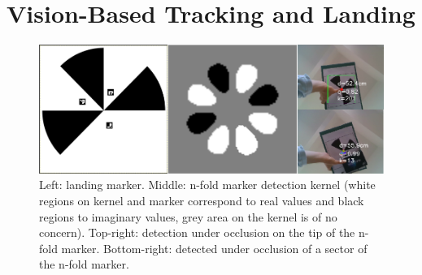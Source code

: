 \documentclass[conference]{IEEEtran}
\newcommand{\stt}[1]{{\small\tt #1}} %
\newcommand{\powprof}{\stt{powprofiler}}
\begin{document}

\section{Vision-Based Tracking and Landing}
\label{sec:landing}


\begin{figure}
\centering
\includegraphics[scale=0.26]{n-fold-for-landing3.png}
\caption{Left: landing marker. Middle: n-fold marker detection kernel (white regions on kernel and marker correspond to real values and black regions to imaginary values, grey area on the kernel is of no concern).
Top-right: detection under occlusion on the tip of the n-fold marker.
Bottom-right: detected under occlusion of a sector of the n-fold marker.}
\label{fig:LandingMarker}
\end{figure}
\end{document}
